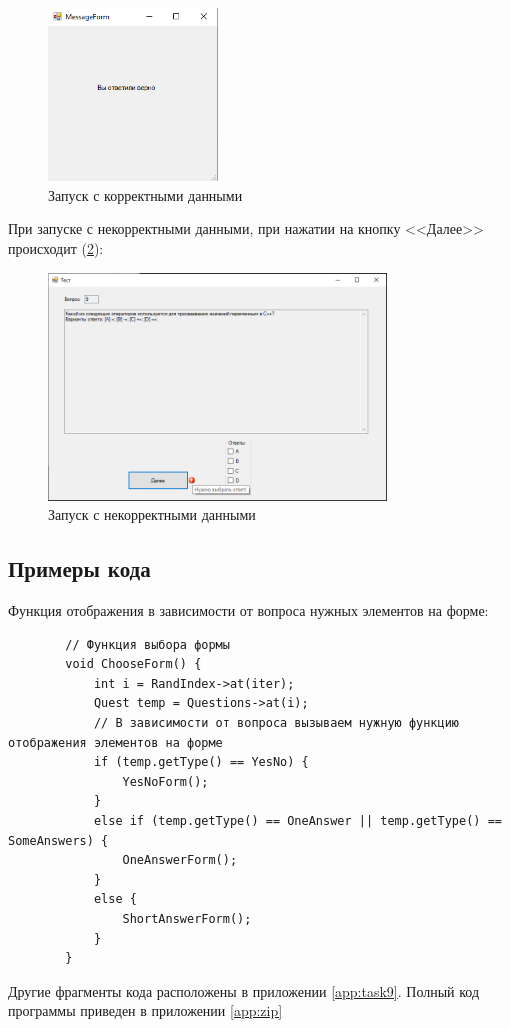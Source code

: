 \begin{figure}[!h]
    \centering
    \includegraphics[width = 0.4\textwidth]{images/Task9/RightAnswer.png}
    \caption{Запуск с корректными данными}
    \label{fig:WorkForm9}
\end{figure}

При запуске с некорректными данными, при нажатии на кнопку <<Далее>> происходит (\ref{fig:BadInputNotIntForm9}):

\newpage

\begin{figure}[!h]
    \centering
    \includegraphics[width = 0.8\textwidth]{images/Task9/OneAnswerBadInput.png}
    \caption{Запуск с некорректными данными}
    \label{fig:BadInputNotIntForm9}
\end{figure}

\subsection{Примеры кода}

Функция отображения в зависимости от вопроса нужных элементов на форме:

\begin{verbatim}
		// Функция выбора формы
		void ChooseForm() {
			int i = RandIndex->at(iter);
			Quest temp = Questions->at(i);
			// В зависимости от вопроса вызываем нужную функцию отображения элементов на форме
			if (temp.getType() == YesNo) {
				YesNoForm();
			}
			else if (temp.getType() == OneAnswer || temp.getType() == SomeAnswers) {
				OneAnswerForm();
			}
			else {
				ShortAnswerForm();
			}
		}
\end{verbatim}

Другие фрагменты кода расположены в приложении \ref{app:task9}. Полный код программы приведен в приложении \ref{app:zip}
